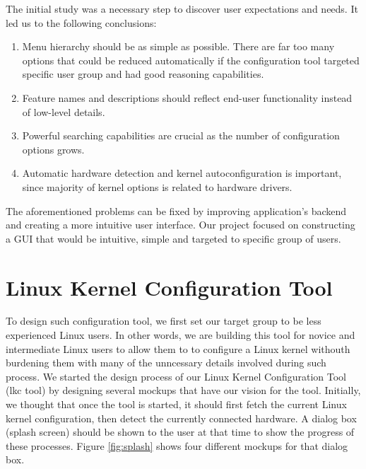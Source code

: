 \documentclass{chi2009}
\begin{document}

The initial study was a necessary step to discover user expectations and needs. It led us to the following conclusions:
\begin{enumerate}
\item Menu hierarchy should be as simple as possible. There are far too many options that could be reduced automatically if the configuration tool targeted specific user group and had good reasoning capabilities.
\item Feature names and descriptions should reflect end-user functionality instead of low-level details.
\item Powerful searching capabilities are crucial as the number of configuration options grows.
\item Automatic hardware detection and kernel autoconfiguration is important, since majority of kernel options is related to hardware drivers.
\end{enumerate}

The aforementioned problems can be fixed by improving application's backend and creating a more intuitive user interface. Our project focused on constructing a GUI that would be intuitive, simple and targeted to specific group of users.

\section{Linux Kernel Configuration Tool}\label{sec:lkc}

To design such configuration tool, we first set our target group to be less experienced Linux users. In other words, we are building this tool for novice and
intermediate Linux users to allow them to to configure a Linux kernel withouth burdening them with many of the unncessary details involved during such process.
We started the design process of our Linux Kernel Configuration Tool (lkc tool) by designing several mockups that have our vision for the tool. Initially, we
thought that once the tool is started, it should first fetch the current Linux kernel configuration, then detect the currently connected hardware. A dialog box
(splash screen) should be shown to the user at that time to show the progress of these processes. Figure \ref{fig:splash} shows four different mockups for that
dialog box. 

\end{document}
